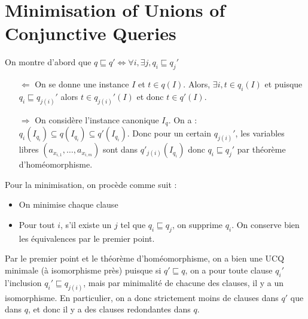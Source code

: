 \documentclass{cours}
\begin{document}
\section{Minimisation of Unions of Conjunctive Queries}
On montre d'abord que $q \sqsubseteq q' \Longleftrightarrow \forall i, \exists j, q_{i} \sqsubseteq q_{j}'$
\begin{itemize}
    \item[$\Leftarrow$] On se donne une instance $I$ et $t \in q(I)$. Alors, $\exists i, t\in q_{i}(I)$ et puisque $q_{i} \sqsubseteq q_{j(i)}'$ alors $t \in q_{j(i)}'(I)$ et donc $t \in q'(I)$.
    \item[$\Rightarrow$] On considère l'instance canonique $I_{q}$. On a : $q_{i}\left(I_{q_{i}}\right) \subseteq q\left(I_{q_{i}}\right) \subseteq q'\left(I_{q_{i}}\right)$. Donc pour un certain $q_{j(i)}'$, les variables libres $\left(a_{x_{i, 1}},\ldots, a_{x_{i, m}}\right)$ sont dans $q'_{j(i)}(I_{q_{i}})$ donc $q_{i} \sqsubseteq q_{j}'$ par théorème d'homéomorphisme.
\end{itemize}
Pour la minimisation, on procède comme suit : 
\begin{itemize}
    \item On minimise chaque clause
    \item Pour tout $i$, s'il existe un $j$ tel que $q_{i} \sqsubseteq q_{j}$, on supprime $q_{i}$. On conserve bien les équivalences par le premier point. 
\end{itemize}
Par le premier point et le théorème d'homéomorphisme, on a bien une UCQ minimale (à isomorphisme près) puisque si $q' \sqsubseteq q$, on a pour toute clause $q_{i}'$ l'inclusion $q_{i}'\sqsubseteq q_{j(i)}$, mais par minimalité de chacune des clauses, il y a un isomorphisme. En particulier, on a donc strictement moins de clauses dans $q'$ que dans $q$, et donc il y a des clauses redondantes dans $q$. 
\end{document}
